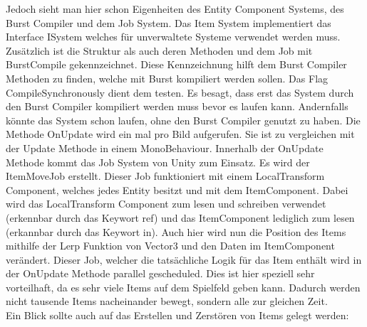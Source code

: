\documentclass[12pt, titlepage]{article}
\begin{document}
Jedoch sieht man hier schon Eigenheiten des Entity Component Systems, des Burst Compiler und dem Job System. Das Item System implementiert das Interface ISystem welches für unverwaltete Systeme verwendet werden muss. Zusätzlich ist die Struktur als auch deren Methoden und dem Job mit BurstCompile gekennzeichnet. Diese Kennzeichnung hilft dem Burst Compiler Methoden zu finden, welche mit Burst kompiliert werden sollen. Das Flag CompileSynchronously dient dem testen. Es besagt, dass erst das System durch den Burst Compiler kompiliert werden muss bevor es laufen kann. Andernfalls könnte das System schon laufen, ohne den Burst Compiler genutzt zu haben. Die Methode OnUpdate wird ein mal pro Bild aufgerufen. Sie ist zu vergleichen mit der Update Methode in einem MonoBehaviour. Innerhalb der OnUpdate Methode kommt das Job System von Unity zum Einsatz. Es wird der ItemMoveJob erstellt. Dieser Job funktioniert mit einem LocalTransform Component, welches jedes Entity besitzt und mit dem ItemComponent. Dabei wird das LocalTransform Component zum lesen und schreiben verwendet (erkennbar durch das Keywort ref) und das ItemComponent lediglich zum lesen (erkannbar durch das Keywort in). Auch hier wird nun die Position des Items mithilfe der Lerp Funktion von Vector3 und den Daten im ItemComponent verändert. Dieser Job, welcher die tatsächliche Logik für das Item enthält wird in der OnUpdate Methode parallel gescheduled. Dies ist hier speziell sehr vorteilhaft, da es sehr viele Items auf dem Spielfeld geben kann. Dadurch werden nicht tausende Items nacheinander bewegt, sondern alle zur gleichen Zeit.\\Ein Blick sollte auch auf das Erstellen und Zerstören von Items gelegt werden:
\end{document}
